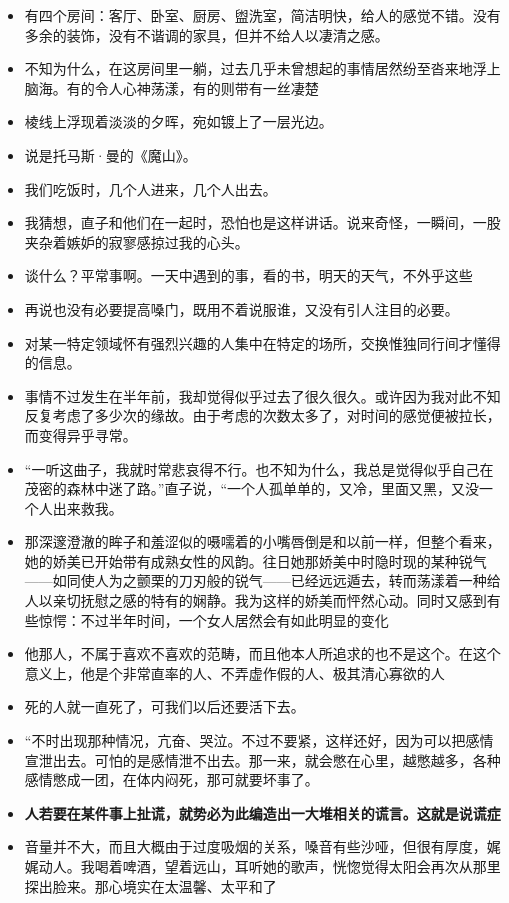 \documentclass[UTF8,a4paper,8pt]{ctexbook}
\begin{document}
\begin{itemize}
		\item 有四个房间：客厅、卧室、厨房、盥洗室，简洁明快，给人的感觉不错。没有多余的装饰，没有不谐调的家具，但并不给人以凄清之感。
		\item 不知为什么，在这房间里一躺，过去几乎未曾想起的事情居然纷至沓来地浮上脑海。有的令人心神荡漾，有的则带有一丝凄楚
		\item 棱线上浮现着淡淡的夕晖，宛如镀上了一层光边。
		\item 说是托马斯·曼的《魔山》。
		\item 我们吃饭时，几个人进来，几个人出去。
		\item 我猜想，直子和他们在一起时，恐怕也是这样讲话。说来奇怪，一瞬间，一股夹杂着嫉妒的寂寥感掠过我的心头。
		\item 谈什么？平常事啊。一天中遇到的事，看的书，明天的天气，不外乎这些
		\item 再说也没有必要提高嗓门，既用不着说服谁，又没有引人注目的必要。
		\item 对某一特定领域怀有强烈兴趣的人集中在特定的场所，交换惟独同行间才懂得的信息。
		\item 事情不过发生在半年前，我却觉得似乎过去了很久很久。或许因为我对此不知反复考虑了多少次的缘故。由于考虑的次数太多了，对时间的感觉便被拉长，而变得异乎寻常。
		\item “一听这曲子，我就时常悲哀得不行。也不知为什么，我总是觉得似乎自己在茂密的森林中迷了路。”直子说，“一个人孤单单的，又冷，里面又黑，又没一个人出来救我。
		\item 那深邃澄澈的眸子和羞涩似的嗫嚅着的小嘴唇倒是和以前一样，但整个看来，她的娇美已开始带有成熟女性的风韵。往日她那娇美中时隐时现的某种锐气——如同使人为之颤栗的刀刃般的锐气——已经远远遁去，转而荡漾着一种给人以亲切抚慰之感的特有的娴静。我为这样的娇美而怦然心动。同时又感到有些惊愕：不过半年时间，一个女人居然会有如此明显的变化
		\item 他那人，不属于喜欢不喜欢的范畴，而且他本人所追求的也不是这个。在这个意义上，他是个非常直率的人、不弄虚作假的人、极其清心寡欲的人
		\item 死的人就一直死了，可我们以后还要活下去。
		\item “不时出现那种情况，亢奋、哭泣。不过不要紧，这样还好，因为可以把感情宣泄出去。可怕的是感情泄不出去。那一来，就会憋在心里，越憋越多，各种感情憋成一团，在体内闷死，那可就要坏事了。
		\item \textbf{人若要在某件事上扯谎，就势必为此编造出一大堆相关的谎言。这就是说谎症}
		\item 音量并不大，而且大概由于过度吸烟的关系，嗓音有些沙哑，但很有厚度，娓娓动人。我喝着啤酒，望着远山，耳听她的歌声，恍惚觉得太阳会再次从那里探出脸来。那心境实在太温馨、太平和了

\end{itemize}
\end{document}
